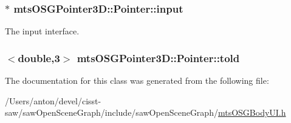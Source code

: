 \subsubsection[{input}]{$\ast$ mts\+O\+S\+G\+Pointer3\+D\+::\+Pointer\+::input}\label{classmts_o_s_g_pointer3_d_1_1_pointer_af85d097dea05276c496eccf2025e575b}


The input interface. 

\hypertarget{classmts_o_s_g_pointer3_d_1_1_pointer_ac94be80751edb5e58d4ee60957cdd3a3}{}
\subsubsection[{told}]{$<$double,3$>$ mts\+O\+S\+G\+Pointer3\+D\+::\+Pointer\+::told}\label{classmts_o_s_g_pointer3_d_1_1_pointer_ac94be80751edb5e58d4ee60957cdd3a3}


The documentation for this class was generated from the following file\+:\begin{DoxyCompactItemize}
\item 
/\+Users/anton/devel/cisst-\/saw/saw\+Open\+Scene\+Graph/include/saw\+Open\+Scene\+Graph/\hyperlink{mts_o_s_g_body_u_i_8h}{mts\+O\+S\+G\+Body\+U\+I.\+h}\end{DoxyCompactItemize}
